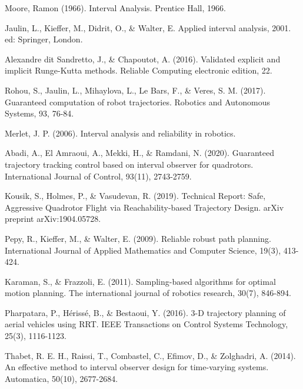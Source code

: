 \documentclass[letterpaper, 10 pt, conference]{ieeeconf}  %
\begin{document}
\begin{thebibliography}{99}


 Moore, Ramon (1966). Interval Analysis. Prentice Hall, 1966. %

 Jaulin, L., Kieffer, M., Didrit, O., \& Walter, E. Applied interval analysis, 2001. ed: Springer, London.

 Alexandre dit Sandretto, J., \& Chapoutot, A. (2016). Validated explicit and implicit Runge-Kutta methods. Reliable Computing electronic edition, 22.

Rohou, S., Jaulin, L., Mihaylova, L., Le Bars, F., \& Veres, S. M. (2017). Guaranteed computation of robot trajectories. Robotics and Autonomous Systems, 93, 76-84.

Merlet, J. P. (2006). Interval analysis and reliability in robotics.

Abadi, A., El Amraoui, A., Mekki, H., \& Ramdani, N. (2020). Guaranteed trajectory tracking control based on interval observer for quadrotors. International Journal of Control, 93(11), 2743-2759.

 Kousik, S., Holmes, P., \& Vasudevan, R. (2019). Technical Report: Safe, Aggressive Quadrotor Flight via Reachability-based Trajectory Design. arXiv preprint arXiv:1904.05728.

 Pepy, R., Kieffer, M., \& Walter, E. (2009). Reliable robust path planning. International Journal of Applied Mathematics and Computer Science, 19(3), 413-424.

 Karaman, S., \& Frazzoli, E. (2011). Sampling-based algorithms for optimal motion planning. The international journal of robotics research, 30(7), 846-894.

Pharpatara, P., Hérissé, B., \& Bestaoui, Y. (2016). 3-D trajectory planning of aerial vehicles using RRT. IEEE Transactions on Control Systems Technology, 25(3), 1116-1123.

Thabet, R. E. H., Raissi, T., Combastel, C., Efimov, D., \& Zolghadri, A. (2014). An effective method to interval observer design for time-varying systems. Automatica, 50(10), 2677-2684.


\end{thebibliography}
\end{document}
